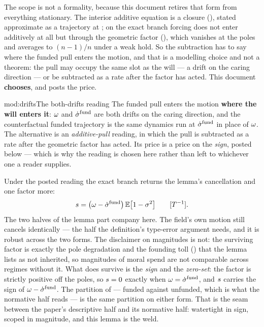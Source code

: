 \documentclass[../main]{subfiles}
\begin{document}
The scope is not a formality, because this document retires that form from everything
stationary. The interior additive equation is a closure (), stated
approximate as a trajectory at ; on the exact branch forcing
does not enter additively at all but through the geometric factor
(), which vanishes at the poles and averages to $(n-1)/n$ under a
weak hold. So the subtraction has to say where the funded pull enters the motion, and
that is a modelling choice and not a theorem: the pull may occupy the same slot as the
will --- a drift on the caring direction --- or be subtracted as a rate after the
factor has acted. This document \textbf{chooses}, and posts the price.

\begin{statement}{mod:drifts}{The both-drifts reading}
  The funded pull enters the motion \textbf{where the will enters it}: $\omega$ and
  $\dot{\sigma}\sp{\mathrm{fund}}$ are both drifts on the caring direction, and the counterfactual funded
  trajectory is the same dynamics run at $\dot{\sigma}\sp{\mathrm{fund}}$ in place of $\omega$. The
  alternative is an \emph{additive-pull} reading, in which the pull is subtracted as a
  rate after the geometric factor has acted. Its price is a price on the \emph{sign},
  posted below --- which is why the reading is chosen here rather than left to
  whichever one a reader supplies.
\end{statement}

Under the posted reading the exact branch returns the lemma's cancellation and one
factor more:
\begin{equation}
  s=\bigl(\omega-\dot{\sigma}\sp{\mathrm{fund}}\bigr)\,
    \mathbb E\bigl[1-\sigma^{2}\bigr]
  \qquad[T\sp{-1}].
  \label{eq:vmoral:cancel-exact}
\end{equation}
The two halves of the lemma part company here. The field's own motion still cancels
identically --- the half the definition's type-error argument needs, and it is robust
across the two forms. The disclaimer on magnitudes is not: the surviving factor is
exactly the pole degradation and the founding toll () that the
lemma lists as not inherited, so magnitudes of moral spend are not comparable across
regimes without it. What does survive is the \emph{sign} and the \emph{zero-set}: the
factor is strictly positive off the poles, so $s=0$ exactly when
$\omega=\dot{\sigma}\sp{\mathrm{fund}}$, and $s$ carries the sign of $\omega-\dot{\sigma}\sp{\mathrm{fund}}$. The
partition of  --- funded against unfunded, which is what the
normative half reads --- is the same partition on either form. That is the seam
between the paper's descriptive half and its normative half: watertight in sign,
scoped in magnitude, and this lemma is the weld.
\end{document}
